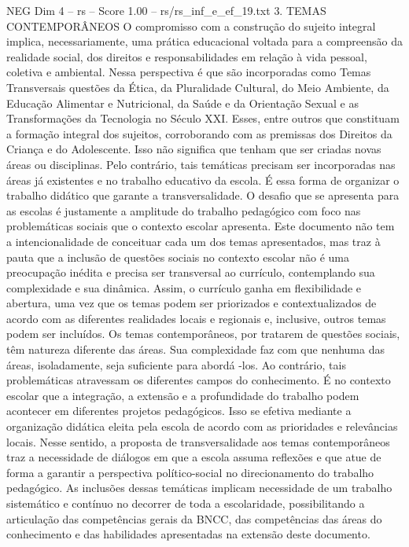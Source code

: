\begin{textsample}{NEG Dim 4 – rs – Score 1.00 – rs/rs\_inf\_e\_ef\_19.txt}  \label{ex:f4_neg_200}
3.
TEMAS CONTEMPORÂNEOS O compromisso com a construção do sujeito integral implica, necessariamente, uma prática educacional voltada para a compreensão da realidade social, dos direitos e responsabilidades em relação à vida pessoal, coletiva e ambiental.
Nessa perspectiva é que são incorporadas como Temas Transversais questões da Ética, da Pluralidade Cultural, do Meio Ambiente, da Educação Alimentar e Nutricional, da Saúde e da Orientação Sexual e as Transformações da Tecnologia no Século XXI.
Esses, entre outros que constituam a formação integral dos sujeitos, corroborando com as premissas dos Direitos da Criança e do Adolescente.
Isso não significa que tenham que ser criadas novas áreas ou disciplinas.
Pelo contrário, tais temáticas precisam ser incorporadas nas áreas já existentes e no trabalho educativo da escola.
É essa forma de organizar o trabalho didático que garante a transversalidade.
O desafio que se apresenta para as escolas é justamente a amplitude do trabalho pedagógico com foco nas problemáticas sociais que o contexto escolar apresenta.
Este documento não tem a intencionalidade de conceituar cada um dos temas apresentados, mas traz à pauta que a inclusão de questões sociais no contexto escolar não é uma preocupação inédita e precisa ser transversal ao currículo, contemplando sua complexidade e sua dinâmica.
Assim, o currículo ganha em flexibilidade e abertura, uma vez que os temas podem ser priorizados e contextualizados de acordo com as diferentes realidades locais e regionais e, inclusive, outros temas podem ser incluídos.
Os temas contemporâneos, por tratarem de questões sociais, têm natureza diferente das áreas.
Sua complexidade faz com que nenhuma das áreas, isoladamente, seja suficiente para abordá -los.
Ao contrário, tais problemáticas atravessam os diferentes campos do conhecimento.
É no contexto escolar que a integração, a extensão e a profundidade do trabalho podem acontecer em diferentes projetos pedagógicos.
Isso se efetiva mediante a organização didática eleita pela escola de acordo com as prioridades e relevâncias locais.
Nesse sentido, a proposta de transversalidade aos temas contemporâneos traz a necessidade de diálogos em que a escola assuma reflexões e que atue de forma a garantir a perspectiva político-social no direcionamento do trabalho pedagógico.
As inclusões dessas temáticas implicam necessidade de um trabalho sistemático e contínuo no decorrer de toda a escolaridade, possibilitando a articulação das competências gerais da BNCC, das competências das áreas do conhecimento e das habilidades apresentadas na extensão deste documento.

\end{textsample}
